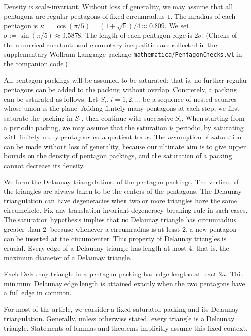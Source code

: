 Density is scale-invariant.  Without loss of
generality, we may assume that all pentagons are regular pentagons of
fixed circumradius $1$.  The inradius of each pentagon is $\kappa:=
\cos (\pi/5) = (1+\sqrt{5})/4 \approx 0.809$. We set $\sigma :=
\sin(\pi/5) \approx 0.5878$.  The length of each pentagon edge is
$2\sigma$.  (Checks of the numerical constants and elementary inequalities
are collected in the supplementary Wolfram Language package
{\tt mathematica/\allowbreak PentagonChecks.wl} in the companion code.)

All pentagon packings will be assumed to be saturated; that is, no
further regular pentagons can be added to the packing without overlap.
Concretely, a packing can be saturated as follows.  Let $S_i$,
$i=1,2,\ldots$ be a sequence of nested squares whose union is the
plane.  Adding finitely many pentagons at each step, we first saturate
the packing in $S_1$, then continue with successive $S_i$.
When starting from a periodic packing, we may assume that the saturation
is periodic, by saturating with finitely many pentagons on a quotient torus.
The
assumption of saturation can be made without loss of generality,
because our ultimate aim is to give upper bounds on the density of
pentagon packings, and the saturation of a packing cannot decrease its
density.

We form the Delaunay triangulations of the pentagon packings.  The
vertices of the triangles are always taken to be the centers of the
pentagons.  The Delaunay triangulation can have degeneracies when two
or more triangles have the same circumcircle.  Fix any
translation-invariant degeneracy-breaking rule in such cases.  The
saturation hypothesis implies that no Delaunay triangle has
circumradius greater than $2$, because whenever a circumradius is at
least $2$, a new pentagon can be inserted at the circumcenter.  This
property of Delaunay triangles is crucial.  Every edge of a Delaunay
triangle has length at most $4$; that is, the maximum diameter of a
Delaunay triangle.

Each Delaunay triangle in a pentagon packing has edge lengths at least
$2\kappa$.  This minimum Delaunay edge length is attained exactly when
the two pentagons have a full edge in common.

For most of the article, we consider a fixed saturated packing and its
Delaunay triangulation.  Generally, unless otherwise stated,
every triangle is a  Delaunay triangle.
Statements of lemmas and theorems implicitly
assume this fixed context.

